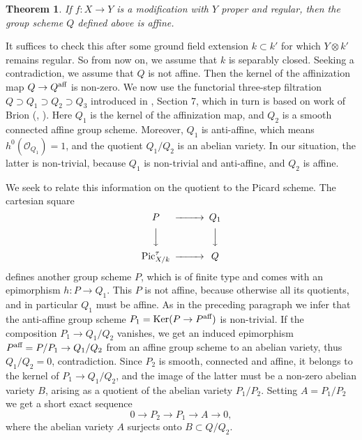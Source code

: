 \documentclass[oneside, 12pt]{amsart}
\newcommand\mylabel[1]{\label{#1}\marginpar{\vspace{-1ex}\medskip\medskip\footnotesize \tt #1}}
\renewcommand\mylabel[1]{\label{#1}}
\newtheorem{theorem}{Theorem}[section]
\theoremstyle{definition}
\theoremstyle{remark}
\newcommand{\aff}{\text{\rm aff}}
\newcommand{\Kernel}{\operatorname{Ker}}
\newcommand{\lra}{\longrightarrow}
\renewcommand{\O}{\mathscr{O}}
\newcommand{\Pic}{\operatorname{Pic}}
\newcommand{\ra}{\rightarrow}
\begin{document}
\begin{theorem}
\mylabel{picard quotient affine}
If $f:X\ra Y$ is a modification with $Y$   proper and regular, then the group scheme  $Q$ defined above is affine.
\end{theorem}

\proof
It suffices to check this after some  ground field extension $k\subset k'$ for which $Y\otimes k'$ remains regular.
So from now on, we assume that $k$ is separably closed.
Seeking a contradiction, we assume that $Q$ is not affine.
Then the kernel  of the affinization map $Q\ra Q^\aff$ is non-zero. 
We now use the functorial three-step filtration $Q \supset Q_1\supset Q_2\supset Q_3$ introduced in \cite{Laurent; Schroeer 2021}, Section 7,
which in turn is based  on work of Brion (\cite{Brion 2009}, \cite{Brion 2017}).
Here  $Q_1$ is the kernel of the affinization map, and $Q_2$ is a smooth connected affine group scheme.
Moreover,  $Q_1$ is anti-affine, which means $h^0(\O_{Q_1})=1$, and the quotient $Q_1/Q_2$ is an abelian variety.
In our situation, the latter is non-trivial, because $Q_1$ is non-trivial and anti-affine, and $Q_2$ is affine.
 
We seek to relate this information on the quotient to the Picard scheme. The cartesian square
$$
\begin{CD}
P		@>>>	Q_1\\
@VVV			@VVV\\
\Pic^\tau_{X/k}	@>>>	Q
\end{CD}
$$
defines  another group scheme $P$, which is  of finite type and comes with an epimorphism $h:P\ra Q_1$.
This $P$ is not affine, because otherwise all its quotients, and in particular $Q_1$ must be affine.
As in the preceding paragraph we infer  that the anti-affine group scheme $P_1=\Kernel(P\ra P^\aff)$ is non-trivial. 
If the composition   $P_1\ra Q_1/Q_2$ vanishes, we get an induced
epimorphism $P^\aff=P/P_1\ra Q_1/Q_2$ from an affine group scheme to an abelian variety, thus $Q_1/Q_2=0$, contradiction.
Since $P_2$ is smooth, connected and affine, it belongs to the kernel of $P_1\ra Q_1/Q_2$,
and the image of the latter must be a non-zero abelian variety $B$, arising as a quotient of the abelian variety $P_1/P_2$.
Setting $A=P_1/P_2$ we get  a short exact sequence
$$
0\lra P_2\lra P_1\lra A\lra 0,
$$
where the abelian variety $A$ surjects onto $B \subset Q/Q_2$.
\end{document}

